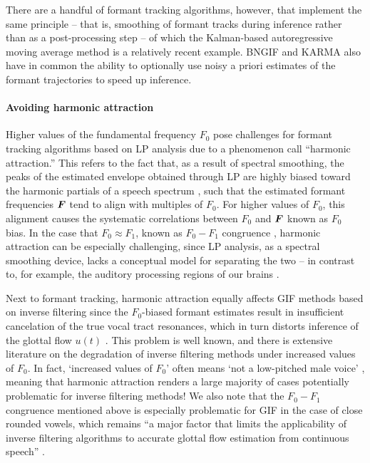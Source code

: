 \begin{chaptersections}
There are a handful of formant tracking algorithms, however,
that implement the same principle -- that is, smoothing of formant tracks during inference rather than as a post-processing step -- of which the Kalman-based autoregressive moving average \citep[KARMA,][]{Mehta2012} method is a relatively recent example.
BNGIF and KARMA also have in common the ability to optionally use noisy a priori estimates of the formant trajectories to speed up inference.%

\paragraph{Avoiding harmonic attraction}
Higher values of the fundamental frequency $F_0$ pose challenges for formant tracking algorithms based on LP analysis due to a phenomenon \cite{Whalen2022} call ``harmonic attraction.''
This refers to the fact that, as a result of spectral smoothing, the peaks of the estimated envelope obtained through LP are highly biased toward the harmonic partials of a speech spectrum \citep{Yoshii2013}, such that the estimated formant frequencies ${\bm F}$ tend to align with multiples of $F_0$.
For higher values of $F_0$, this alignment causes the systematic correlations between $F_0$ and ${\bm F}$ known as $F_0$ bias.
In the case that $F_0 \approx F_1$, known as $F_0-F_1$ congruence \citep{Kent2018}, harmonic attraction can be especially challenging, since LP analysis, as a spectral smoothing device, lacks a conceptual model for separating the two -- in contrast to, for example, the auditory processing regions of our brains \citep{Schnupp2011}.

Next to formant tracking, harmonic attraction equally affects GIF methods based on inverse filtering since the $F_0$-biased formant estimates result in insufficient cancelation of the true vocal tract resonances, which in turn distorts inference of the glottal flow $u(t)$ \citep{Auvinen2014}.
This problem is well known, and there is extensive literature on the degradation of inverse filtering methods under increased values of $F_0$.
In fact, `increased values of $F_0$' often means `not a low-pitched male voice' \citep{Airaksinen2014}, meaning that harmonic attraction renders a large majority of cases  potentially problematic for inverse filtering methods!
We also note that the $F_0-F_1$ congruence mentioned above is especially problematic for GIF in the case of close rounded vowels, which remains ``a major factor that limits the applicability of inverse filtering algorithms to accurate glottal flow estimation from continuous speech'' \citep[][p.~17]{Chien2017}.


\end{chaptersections}
